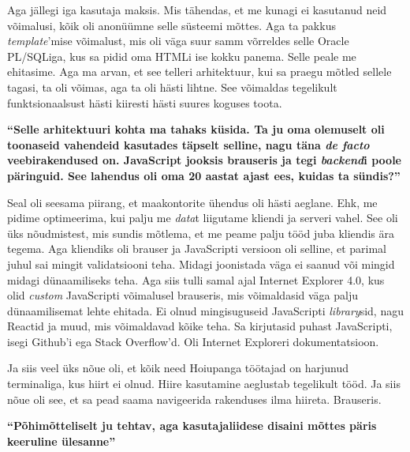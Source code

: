 Aga jällegi iga kasutaja maksis. Mis tähendas, et me kunagi ei kasutanud neid 
võimalusi, kõik oli anonüümne selle süsteemi mõttes. Aga ta pakkus 
\emph{template}'mise võimalust, mis oli väga suur samm võrreldes selle Oracle 
PL/SQLiga, kus sa pidid oma HTMLi ise kokku panema. Selle peale me ehitasime. 
Aga ma arvan, et see telleri arhitektuur, kui sa praegu mõtled sellele tagasi, 
ta oli võimas, aga ta oli hästi lihtne. See võimaldas tegelikult 
funktsionaalsust hästi kiiresti hästi suures koguses toota.

\textbf{\enquote{Selle arhitektuuri kohta ma tahaks küsida. Ta ju oma olemuselt 
oli toonaseid vahendeid kasutades täpselt selline, nagu täna \emph{de facto} 
veebirakendused on. JavaScript jooksis brauseris ja 
tegi \emph{backend}i poole päringuid. See lahendus oli oma 20 aastat ajast ees, 
kuidas ta sündis?}}

Seal oli seesama piirang, et maakontorite ühendus oli hästi aeglane. Ehk, me
pidime optimeerima, kui palju me \emph{data}t liigutame kliendi ja serveri 
vahel. See oli üks nõudmistest, mis sundis mõtlema, et me peame palju tööd juba 
kliendis ära tegema. Aga kliendiks oli brauser ja JavaScripti versioon oli 
selline, et parimal juhul sai mingit validatsiooni teha. Midagi joonistada väga
ei saanud või mingid midagi dünaamiliseks teha. Aga siis tulli samal ajal 
Internet Explorer 4.0, kus olid \emph{custom} 
JavaScripti võimalusel brauseris, mis võimaldasid väga palju dünaamilisemat 
lehte ehitada. Ei olnud mingisuguseid JavaScripti \emph{library}sid, nagu 
Reactid ja muud, mis võimaldavad kõike teha. Sa kirjutasid puhast 
JavaScripti, isegi Github'i ega Stack Overflow'd. Oli Internet Exploreri 
dokumentatsioon.

Ja siis veel üks nõue oli, et kõik need Hoiupanga töötajad on harjunud 
terminaliga, kus  hiirt ei olnud. Hiire kasutamine aeglustab tegelikult tööd. 
Ja siis nõue oli see, et sa pead saama navigeerida rakenduses ilma hiireta. 
Brauseris. 

\textbf{\enquote{Põhimõtteliselt ju tehtav, aga kasutajaliidese disaini mõttes 
päris keeruline ülesanne}}

